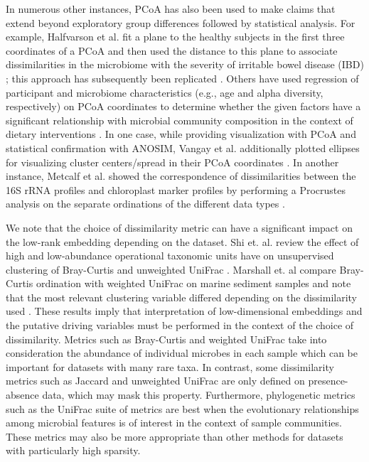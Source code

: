 In numerous other instances, PCoA has also been used to make claims that extend beyond exploratory group differences followed by statistical analysis. For example, Halfvarson et al. fit a plane to the healthy subjects in the first three coordinates of a PCoA and then used the distance to this plane to associate dissimilarities in the microbiome with the severity of irritable bowel disease (IBD) \cite{Halfvarson2017-se}; this approach has subsequently been replicated \cite{Gonzalez2018-ez}. Others have used regression of participant and microbiome characteristics (e.g., age and alpha diversity, respectively) on PCoA coordinates to determine whether the given factors have a significant relationship with microbial community composition in the context of dietary interventions \cite{Lang2018-io}. In one case, while providing visualization with PCoA and statistical confirmation with ANOSIM, Vangay et al. additionally plotted ellipses for visualizing cluster centers/spread in their PCoA coordinates \cite{Vangay2018-qf}. In another instance, Metcalf et al. showed the correspondence of dissimilarities between the 16S rRNA profiles and chloroplast marker profiles by performing a Procrustes analysis on the separate ordinations of the different data types \cite{Metcalf2017-me}.

We note that the choice of dissimilarity metric can have a significant impact on the low-rank embedding depending on the dataset. Shi et. al. review the effect of high and low-abundance operational taxonomic units have on unsupervised clustering of Bray-Curtis and unweighted UniFrac \cite{Shi2021-ln}. Marshall et. al compare Bray-Curtis ordination with weighted UniFrac on marine sediment samples and note that the most relevant clustering variable differed depending on the dissimilarity used \cite{Marshall2019-nc}. These results imply that interpretation of low-dimensional embeddings and the putative driving variables must be performed in the context of the choice of dissimilarity. Metrics such as Bray-Curtis and weighted UniFrac take into consideration the abundance of individual microbes in each sample which can be important for datasets with many rare taxa. In contrast, some dissimilarity metrics such as Jaccard and unweighted UniFrac are only defined on presence-absence data, which may mask this property.  Furthermore, phylogenetic metrics such as the UniFrac suite of metrics are best when the evolutionary relationships among microbial features is of interest in the context of sample communities. These metrics may also be more appropriate than other methods for datasets with particularly high sparsity.

